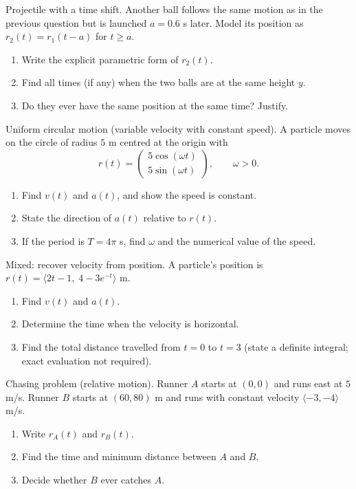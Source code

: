 \documentclass[11pt]{article}
\def\textbf#1{#1}%
\def\mathbf#1{#1}%
\newcounter{question}
\begin{document}
\begin{question}
\textbf{Projectile with a time shift.}
Another ball follows the same motion as in the previous question but is launched \(a=0.6\) s later. Model its position as \(\mathbf{r}_2(t)=\mathbf{r}_1(t-a)\) for \(t\ge a\).
\begin{enumerate}
  \item Write the explicit parametric form of \(\mathbf{r}_2(t)\).
  \item Find all times (if any) when the two balls are at the same height \(y\).
  \item Do they ever have the same position at the same time? Justify.
\end{enumerate}
\end{question}

\begin{question}
\textbf{Uniform circular motion (variable velocity with constant speed).}
A particle moves on the circle of radius \(5\) m centred at the origin with
\[
\mathbf{r}(t)=\begin{pmatrix}5\cos(\omega t)\\[2pt]5\sin(\omega t)\end{pmatrix},\qquad \omega>0.
\]
\begin{enumerate}
  \item Find \(\mathbf{v}(t)\) and \(\mathbf{a}(t)\), and show the speed is constant.
  \item State the direction of \(\mathbf{a}(t)\) relative to \(\mathbf{r}(t)\).
  \item If the period is \(T=4\pi\) s, find \(\omega\) and the numerical value of the speed.
\end{enumerate}
\end{question}

\begin{question}
\textbf{Mixed: recover velocity from position.}
A particle’s position is \(\mathbf{r}(t)=\langle 2t-1,\; 4-3e^{-t}\rangle\) m.
\begin{enumerate}
  \item Find \(\mathbf{v}(t)\) and \(\mathbf{a}(t)\).
  \item Determine the time when the velocity is horizontal.
  \item Find the total distance travelled from \(t=0\) to \(t=3\) (state a definite integral; exact evaluation not required).
\end{enumerate}
\end{question}

\begin{question}
\textbf{Chasing problem (relative motion).}
Runner \(A\) starts at \((0,0)\) and runs east at \(5\) m/s. Runner \(B\) starts at \((60,80)\) m and runs with constant velocity \(\langle -3,-4\rangle\) m/s.
\begin{enumerate}
  \item Write \(\mathbf{r}_A(t)\) and \(\mathbf{r}_B(t)\).
  \item Find the time and minimum distance between \(A\) and \(B\).
  \item Decide whether \(B\) ever catches \(A\).
\end{enumerate}
\end{question}
\end{document}
